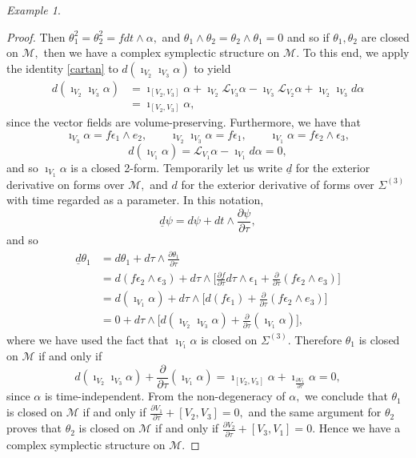\documentclass[a4paper,onecolumn,12pt]{article}
\theoremstyle{definition}
\theoremstyle{remark}
\newtheorem{ex}[thm]{Example}
\newcommand{\e}{\epsilon}
\newcommand{\dd}[2]{\frac{\partial #1}{\partial #2}}
\begin{document}
\begin{ex}
\begin{proof}
		Then $\theta^{2}_{1}=\theta^{2}_{2}=f dt\wedge\alpha,$ and $\theta_{1}\wedge\theta_{2}=\theta_{2}\wedge\theta_{1}=0$ and so if $\theta_{1}, \theta_{2}$ are closed on $\mathcal{M},$ then we have a complex symplectic structure on $\mathcal{M}.$ To this end, we apply the identity \ref{cartan} to $d(\imath_{V_{2}}\imath_{V_{3}}\alpha)$ to yield
		\begin{align*}
			d(\imath_{V_{2}}\imath_{V_{3}}\alpha) &= \imath_{[V_{2},V_{3}]}\alpha + \imath_{V_{2}}\mathcal{L}_{V_{3}}\alpha - \imath_{V_{3}}\mathcal{L}_{V_{2}}\alpha + \imath_{V_{2}}\imath_{V_{3}}d\alpha\\
			&= \imath_{[V_{2},V_{3}]}\alpha,
		\end{align*}
		since the vector fields are volume-preserving. Furthermore, we have that 
		\begin{equation*}
		\imath_{V_{3}}\alpha = f\e_{1}\wedge e_{2},\qquad \imath_{V_{2}}\imath_{V_{3}}\alpha = f\e_{1},\qquad \imath_{V_{1}}\alpha=f\e_{2}\wedge\e_{3},
		\end{equation*}
		\begin{equation*}
		d(\imath_{V_{1}}\alpha) = \mathcal{L}_{V_{1}}\alpha - \imath_{V_{1}}d\alpha = 0,
		\end{equation*}
		and so $\imath_{V_{1}}\alpha$ is a closed 2-form. Temporarily let us write $\underline{d}$ for the exterior derivative on forms over $\mathcal{M},$ and $d$ for the exterior derivative of forms over $\Sigma^{(3)}$ with time regarded as a parameter. In this notation,
		\begin{equation*}
			\underline{d}\psi = d\psi + dt\wedge\dd{\psi}{\tau},
		\end{equation*}
		and so
		\begin{align*}
			\underline{d}\theta_{1} &= d\theta_{1} + d\tau \wedge \dd{\theta_{1}}{\tau}\\
			&= d(f\e_{2}\wedge\e_{3}) + d\tau\wedge \Bigg[\dd{f}{\tau} d\tau\wedge\e_{1} + \dd{}{\tau}(f \e_{2} \wedge e_{3})\Bigg]\\
			&= d(\imath_{V_{1}}\alpha) + d\tau\wedge \Bigg[d(f\e_{1}) + \dd{}{\tau}(f \e_{2} \wedge e_{3})\Bigg]\\
			&= 0 + d\tau\wedge \Bigg[d(\imath_{V_{2}}\imath_{V_{3}}\alpha) + \dd{}{\tau}(\imath_{V_{1}}\alpha)\Bigg],
		\end{align*}
		where we have used the fact that $\imath_{V_{1}}\alpha$ is closed on $\Sigma^{(3)}.$ Therefore $\theta_{1}$ is closed on $\mathcal{M}$ if and only if
		\begin{equation*}
		d(\imath_{V_{2}}\imath_{V_{3}}\alpha) + \dd{}{\tau}(\imath_{V_{1}}\alpha)
		= \imath_{[V_{2},V_{3}]}\alpha + \imath_{\dd{V_{1}}{\tau}}\alpha
		= 0,
		\end{equation*}
		since $\alpha$ is time-independent. From the non-degeneracy of $\alpha,$ we conclude that $\theta_{1}$ is closed on $\mathcal{M}$ if and only if $\dd{V_{1}}{\tau} + [V_{2},V_{3}] = 0,$ and the same argument for $\theta_{2}$ proves that $\theta_{2}$ is closed on $\mathcal{M}$ if and only if $\dd{V_{2}}{\tau} + [V_{3},V_{1}] = 0.$ Hence we have a complex symplectic structure on $\mathcal{M}.$
	\end{proof}
	

\end{ex}
\end{document}
